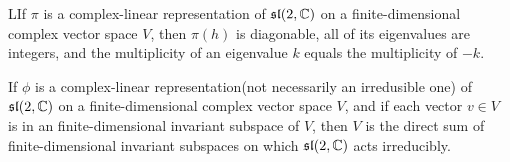 \documentclass{article}
\begin{document}
\begin{corollary}
LIf $\pi$ is a complex-linear representation of $\mathfrak{sl}(2,\mathbb{C})$ on a finite-dimensional complex vector space $V$, then $\pi(h)$ is diagonable, all of its eigenvalues are integers, and the multiplicity of an eigenvalue $k$ equals the multiplicity of $-k$. 
\end{corollary}
\begin{corollary}
If $\phi$ is a complex-linear representation(not necessarily an irredusible one) of $\mathfrak{sl}(2,\mathbb{C})$ on a finite-dimensional complex vector space $V$, and if each vector $v\in V$ is in an finite-dimensional invariant subspace of $V$, then $V$ is the direct sum of finite-dimensional invariant subspaces on which $\mathfrak{sl}(2,\mathbb{C})$ acts irreducibly.  
\end{corollary}
\end{document}
